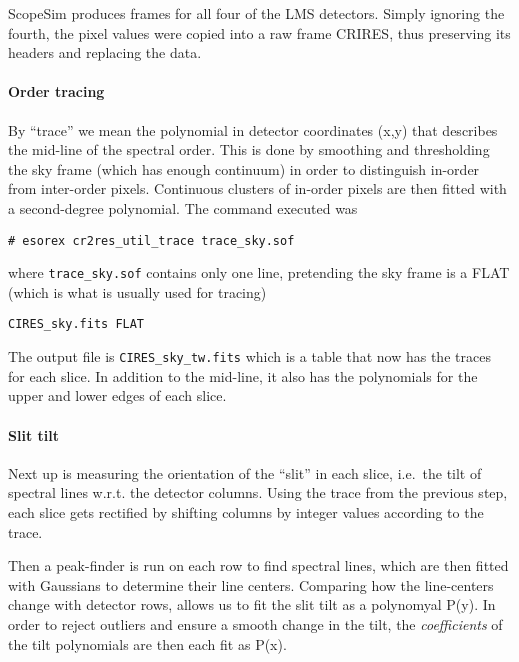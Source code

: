 ScopeSim produces frames for all four of the LMS detectors. Simply
ignoring the fourth, the pixel values were copied into a raw frame
CRIRES, thus preserving its headers and replacing the data.

\paragraph{Order tracing}

By ``trace'' we mean the polynomial in detector coordinates (x,y) that
describes the mid-line of the spectral order. This is done by smoothing
and thresholding the sky frame (which has enough continuum) in order to
distinguish in-order from inter-order pixels. Continuous clusters of
in-order pixels are then fitted with a second-degree polynomial. The
command executed was

\begin{verbatim}
# esorex cr2res_util_trace trace_sky.sof
\end{verbatim}

where \texttt{trace\_sky.sof} contains only one line, pretending the
sky frame is a FLAT (which is what is usually used for tracing)

\begin{verbatim}
CIRES_sky.fits FLAT
\end{verbatim}

The output file is \texttt{CIRES\_sky\_tw.fits} which is a table that
now has the traces for each slice. In addition to the mid-line, it also
has the polynomials for the upper and lower edges of each slice.

\paragraph{Slit tilt}

Next up is measuring the orientation of the ``slit'' in each slice,
i.e.~the tilt of spectral lines w.r.t. the detector columns. Using the
trace from the previous step, each slice gets rectified by shifting
columns by integer values according to the trace.

Then a peak-finder is run on each row to find spectral lines, which are
then fitted with Gaussians to determine their line centers. Comparing
how the line-centers change with detector rows, allows us to fit the
slit tilt as a polynomyal P(y). In order to reject outliers and ensure a
smooth change in the tilt, the \emph{coefficients} of the tilt
polynomials are then each fit as P(x).

